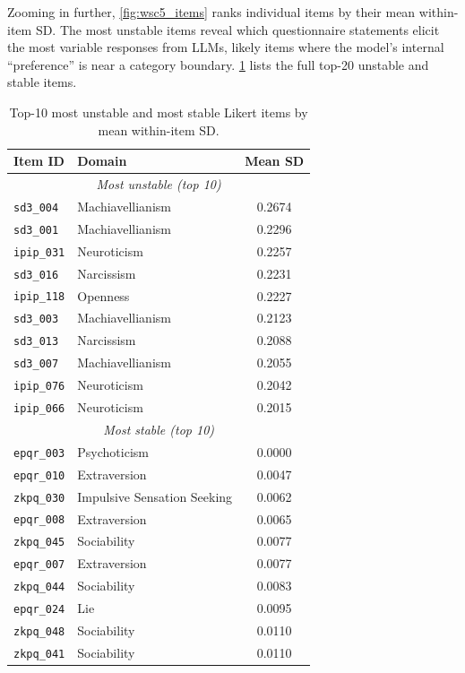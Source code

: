 \documentclass[11pt]{article}
\begin{document}
Zooming in further, \cref{fig:wsc5_items} ranks individual items by their mean within-item SD.
The most unstable items reveal which questionnaire statements elicit the most variable responses from LLMs, likely items where the model's internal ``preference'' is near a category boundary.
\cref{tab:wsc_items_top} lists the full top-20 unstable and stable items.

\begin{table}[t]
\centering\small
\caption{Top-10 most unstable and most stable Likert items by mean within-item SD.}
\label{tab:wsc_items_top}
\begin{tabular}{llc}
\toprule
Item ID & Domain & Mean SD \\
\midrule
\multicolumn{3}{c}{\itshape Most unstable (top 10)} \\
\midrule
\texttt{sd3\_004} & Machiavellianism & 0.2674 \\
\texttt{sd3\_001} & Machiavellianism & 0.2296 \\
\texttt{ipip\_031} & Neuroticism & 0.2257 \\
\texttt{sd3\_016} & Narcissism & 0.2231 \\
\texttt{ipip\_118} & Openness & 0.2227 \\
\texttt{sd3\_003} & Machiavellianism & 0.2123 \\
\texttt{sd3\_013} & Narcissism & 0.2088 \\
\texttt{sd3\_007} & Machiavellianism & 0.2055 \\
\texttt{ipip\_076} & Neuroticism & 0.2042 \\
\texttt{ipip\_066} & Neuroticism & 0.2015 \\
\midrule
\multicolumn{3}{c}{\itshape Most stable (top 10)} \\
\midrule
\texttt{epqr\_003} & Psychoticism & 0.0000 \\
\texttt{epqr\_010} & Extraversion & 0.0047 \\
\texttt{zkpq\_030} & Impulsive Sensation Seeking & 0.0062 \\
\texttt{epqr\_008} & Extraversion & 0.0065 \\
\texttt{zkpq\_045} & Sociability & 0.0077 \\
\texttt{epqr\_007} & Extraversion & 0.0077 \\
\texttt{zkpq\_044} & Sociability & 0.0083 \\
\texttt{epqr\_024} & Lie & 0.0095 \\
\texttt{zkpq\_048} & Sociability & 0.0110 \\
\texttt{zkpq\_041} & Sociability & 0.0110 \\
\bottomrule
\end{tabular}
\end{table}
\end{document}
